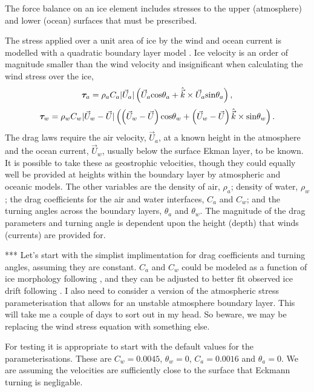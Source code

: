 The force balance on an ice element includes stresses to the upper (atmosphere) and lower (ocean) surfaces that must be prescribed. 

The stress applied over a unit area of ice by the wind and ocean current is modelled with a quadratic boundary layer model \cite{Brown79,McPhee_Smith,McPheeJPO}. Ice velocity is an order of magnitude smaller than the wind velocity and insignificant when calculating the wind stress over the ice,
%
\begin{equation}
    {\boldsymbol{\tau}}_a = \rho_a C_a |\Vec{U}_a| 
          \left ( \Vec{U}_a \mathrm{cos} \theta_a + 
          \hat{\Vec{k}} \times \Vec{U}_a \mathrm{sin} \theta_a \right ) ,
\end{equation}
%
\begin{equation}
    {\boldsymbol{\tau}}_w = \rho_w C_w |\Vec{U}_w - \Vec{U}| 
         \left ( \left (\Vec{U}_w - \Vec{U} \right ) \mathrm{cos} \theta_w +
         \left (\Vec{U}_w - \Vec{U} \right ) \hat{\Vec{k}} \times \mathrm{sin} \theta_w
         \right ) .
\end{equation}
%
The drag laws require the air velocity, $\Vec{U}_a$, at a known height in the atmosphere and the ocean current, $\Vec{U}_w$, usually below the surface Ekman layer, to be known. It is possible to take these as geostrophic velocities, though they could equally well be provided at heights within the boundary layer by atmospheric and oceanic models. The other variables are the density of air, $\rho_a$; density of water, $\rho_w$; the drag coefficients for the air and water interfaces, $C_a$ and $C_w$; and the turning angles across the boundary layers, $\theta_a$ and $\theta_w$. The magnitude of the drag parameters and turning angle is dependent upon the height (depth) that winds (currents) are provided for.

{\color{red} *** Let's start with the simplist implimentation for drag coefficients and turning angles, assuming they are constant. $C_a$ and $C_w$ could be modeled as a function of ice morphology following \cite{Tsamadosetal2014}, and they can be adjusted to better fit observed ice drift following \cite{Kreysher??}. I also need to consider a version of the atmospheric stress parameterisation that allows for an unstable atmosphere boundary layer. This will take me a couple of days to sort out in my head. So beware, we may be replacing the wind stress equation with something else.}

For testing it is appropriate to start with the default values for the parameterisations. These are $C_w = 0.0045$, $\theta_w = 0$, $C_a=0.0016$ and $\theta_a= 0$. We are assuming the velocities are sufficiently close to the surface that Eckmann turning is negligable.


